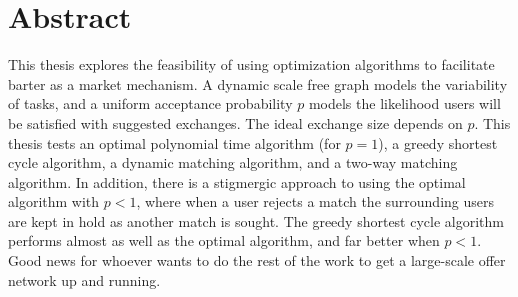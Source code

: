 \documentclass[main.tex]{subfiles}
\begin{document}
\section{Abstract}
This thesis explores the feasibility of using optimization algorithms to facilitate barter as a market mechanism. A dynamic scale free graph models the variability of tasks, and a uniform acceptance probability $p$ models the likelihood users will be satisfied with suggested exchanges. The ideal exchange size depends on $p$. This thesis tests an optimal polynomial time algorithm (for $p=1$), a greedy shortest cycle algorithm, a dynamic matching algorithm, and a two-way matching algorithm. In addition, there is a stigmergic approach to using the optimal algorithm with $p < 1$, where when a user rejects a match the surrounding users are kept in hold as another match is sought. The greedy shortest cycle algorithm performs almost as well as the optimal algorithm, and far better when $p < 1$. Good news for whoever wants to do the rest of the work to get a large-scale offer network up and running.
\end{document}

